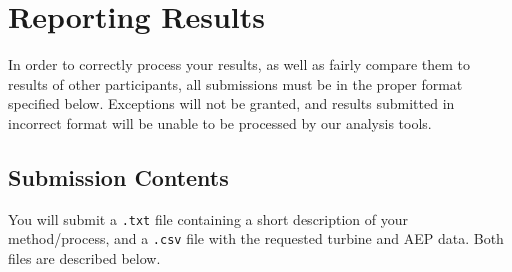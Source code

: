 \documentclass[12pt]{article}
\begin{document}
\newpage
\section{Reporting Results}
In order to correctly process your results, as well as fairly compare them to results of other participants, all submissions must be in the proper format specified below. Exceptions will not be granted, and results submitted in incorrect format will be unable to be processed by our analysis tools.

\subsection{Submission Contents}\label{Sec:RepResults}
You will submit a \texttt{.txt} file containing a short description of your method/process, and a \texttt{.csv} file with the requested turbine and AEP data. Both files are described below.
\end{document}
